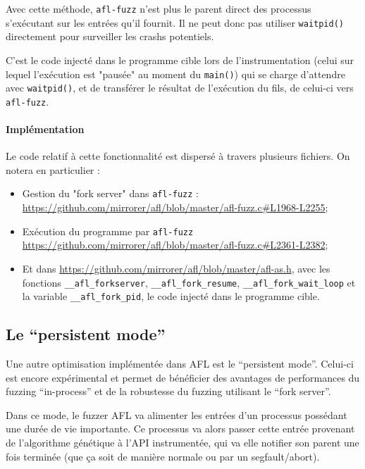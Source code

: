 Avec cette méthode, \lstinline{afl-fuzz} n'est plus le parent direct des processus s'exécutant sur les entrées qu'il fournit.
Il ne peut donc pas utiliser \lstinline{waitpid()} directement pour surveiller les crashs potentiels.

C'est le code injecté dans le programme cible lors de l'instrumentation (celui sur lequel l'exécution est "pausée" au moment du \lstinline{main()}) qui se charge d'attendre avec \lstinline{waitpid()}, et de transférer le résultat de l'exécution du fils, de celui-ci vers \lstinline{afl-fuzz}.

\paragraph{Implémentation}

Le code relatif à cette fonctionnalité est dispersé à travers plusieurs fichiers.
On notera en particulier :
\begin{itemize}
  \item{} Gestion du "fork server" dans \lstinline{afl-fuzz} : \url{https://github.com/mirrorer/afl/blob/master/afl-fuzz.c#L1968-L2255};
  \item{} Exécution du programme par \lstinline{afl-fuzz} \url{https://github.com/mirrorer/afl/blob/master/afl-fuzz.c#L2361-L2382};
  \item{} Et dans \url{https://github.com/mirrorer/afl/blob/master/afl-as.h}, avec les fonctions \lstinline{__afl_forkserver}, \lstinline{__afl_fork_resume}, \lstinline{__afl_fork_wait_loop} et la variable \lstinline{__afl_fork_pid}, le code injecté dans le programme cible.
\end{itemize}

\subsection{Le ``persistent mode''}\label{persistent-mode}

Une autre optimisation implémentée dans AFL est le ``persistent mode''.
Celui-ci est encore expérimental et permet de bénéficier des avantages de performances du fuzzing ``in-process'' et de la robustesse du fuzzing utilisant le ``fork server''.

Dans ce mode, le fuzzer AFL va alimenter les entrées d'un processus possédant une durée de vie importante.
Ce processus va alors passer cette entrée provenant de l'algorithme génétique à l'API instrumentée, qui va elle notifier son parent une fois terminée (que ça soit de manière normale ou par un segfault/abort).

